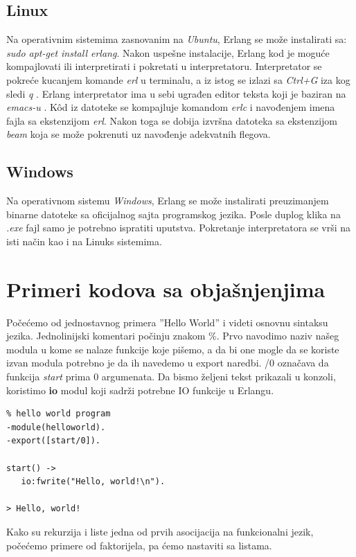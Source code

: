 \documentclass[a4paper]{article}
\begin{document}
{\subsection{Linux}
\label{subsec:instalacijaLinux}
Na operativnim sistemima zasnovanim na {\em Ubuntu}, Erlang se može instalirati sa:
{\em sudo apt-get install erlang}. 
Nakon uspešne instalacije, Erlang kod je moguće kompajlovati
ili interpretirati i pokretati u interpretatoru.
Interpretator se pokreće kucanjem komande {\em erl} u terminalu, a iz istog
se izlazi sa {\em Ctrl+G} iza kog sledi {\em q} \cite{book_joe}.
Erlang interpretator ima u sebi ugrađen editor teksta koji je baziran na {\em emacs-u} \cite{book_fred}.
K\^od iz datoteke se kompajluje komandom {\em erlc} i navođenjem imena fajla sa ekstenzijom {\em erl}.
Nakon toga se dobija izvršna datoteka sa ekstenzijom {\em beam} koja se može
pokrenuti uz navođenje adekvatnih flegova. 


\subsection{Windows}
\label{subsec:instalacijaWindows}
Na operativnom sistemu {\em Windows}, Erlang se može instalirati preuzimanjem binarne datoteke sa oficijalnog sajta \cite{sajt} programskog jezika. Posle duplog klika na {\em .exe} fajl samo je potrebno ispratiti uputstva. Pokretanje interpretatora se vrši na isti način kao i na Linuks sistemima.


\section{Primeri kodova sa objašnjenjima}
\label{sec:primeri}
Počećemo od jednostavnog primera ''Hello World'' i videti osnovnu sintaksu jezika. 
Jednolinijski komentari počinju znakom \%. 
Prvo navodimo naziv našeg modula u kome se nalaze funkcije koje pišemo, 
a da bi one mogle da se koriste izvan modula potrebno je da ih navedemo u export naredbi. /0 označava da funkcija \textit{start} prima 0 argumenata.
Da bismo željeni tekst prikazali u konzoli, koristimo \textbf{io} modul koji sadrži potrebne IO funkcije u Erlangu.
\begin{verbatim}
% hello world program
-module(helloworld). 
-export([start/0]). 

start() -> 
   io:fwrite("Hello, world!\n").

> Hello, world!
\end{verbatim}

Kako su rekurzija i liste jedna od prvih asocijacija na funkcionalni jezik, po\v ce\' cemo primere od faktorijela, pa \' cemo nastaviti sa listama.\\

}
\end{document}
